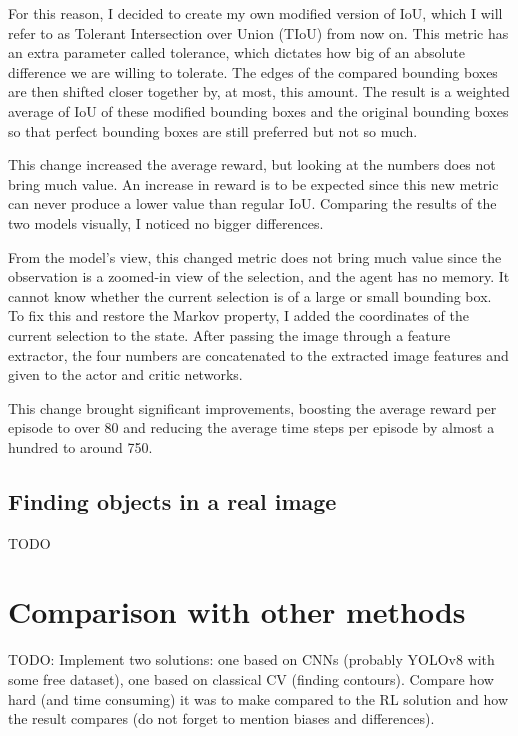 \documentclass[
  digital,     %
  oneside,     %
  nosansbold,  %
  nocolorbold, %
  lof,         %
  lot,         %
]{fithesis4}
\begin{document}
For this reason, I decided to create my own modified version of IoU, which I will refer to as Tolerant Intersection over Union (TIoU) from now on. This metric has an extra parameter called tolerance, which dictates how big of an absolute difference we are willing to tolerate. The edges of the compared bounding boxes are then shifted closer together by, at most, this amount. The result is a weighted average of IoU of these modified bounding boxes and the original bounding boxes so that perfect bounding boxes are still preferred but not so much.

This change increased the average reward, but looking at the numbers does not bring much value. An increase in reward is to be expected since this new metric can never produce a lower value than regular IoU. Comparing the results of the two models visually, I noticed no bigger differences.

From the model's view, this changed metric does not bring much value since the observation is a zoomed-in view of the selection, and the agent has no memory. It cannot know whether the current selection is of a large or small bounding box. To fix this and restore the Markov property, I added the coordinates of the current selection to the state. After passing the image through a feature extractor, the four numbers are concatenated to the extracted image features and given to the actor and critic networks.

This change brought significant improvements, boosting the average reward per episode to over 80 and reducing the average time steps per episode by almost a hundred to around 750.

\section{Finding objects in a real image}
TODO

\chapter{Comparison with other methods}
TODO: Implement two solutions: one based on CNNs (probably YOLOv8 with some free dataset), one based on classical CV (finding contours).
%
Compare how hard (and time consuming) it was to make compared to the RL solution and how the result compares (do not forget to mention biases and differences).


\printbibliography[heading=bibintoc] %
\end{document}
